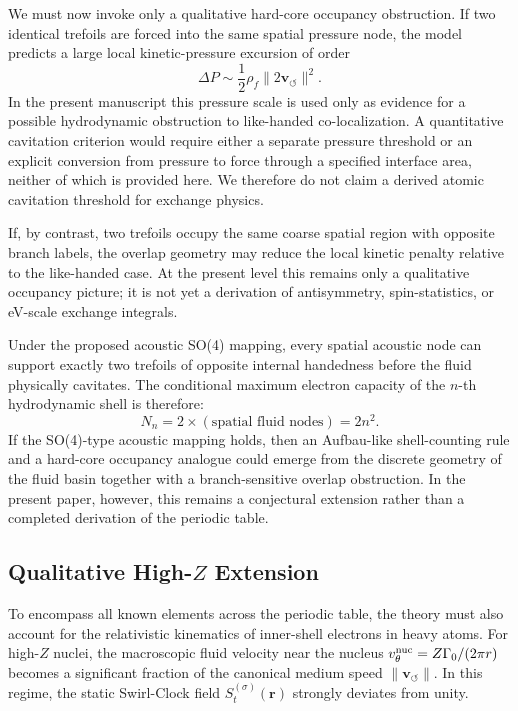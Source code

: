 \documentclass[11pt,a4paper]{article}
\begin{document}
        We must now invoke only a qualitative hard-core occupancy obstruction. If two identical trefoils are forced into the same spatial pressure node, the model predicts a large local kinetic-pressure excursion of order
        \begin{equation}
            \Delta P \sim \frac{1}{2}\rho_{\!f}\lVert 2\mathbf{v}_{\!\boldsymbol{\circlearrowleft}} \rVert^2.
        \end{equation}
        In the present manuscript this pressure scale is used only as evidence for a possible hydrodynamic obstruction to like-handed co-localization. A quantitative cavitation criterion would require either a separate pressure threshold or an explicit conversion from pressure to force through a specified interface area, neither of which is provided here. We therefore do not claim a derived atomic cavitation threshold for exchange physics.
        
        If, by contrast, two trefoils occupy the same coarse spatial region with opposite branch labels, the overlap geometry may reduce the local kinetic penalty relative to the like-handed case. At the present level this remains only a qualitative occupancy picture; it is not yet a derivation of antisymmetry, spin-statistics, or eV-scale exchange integrals.
        
        Under the proposed acoustic SO(4) mapping, every spatial acoustic node can support exactly two trefoils of opposite internal handedness before the fluid physically cavitates. The conditional maximum electron capacity of the $n$-th hydrodynamic shell is therefore:
        \begin{equation}
            \label{eq:AufbauDerived}
            \boxed{
                N_n = 2 \times (\text{spatial fluid nodes}) = 2n^2.
            }
        \end{equation}
        If the SO(4)-type acoustic mapping holds, then an Aufbau-like shell-counting rule and a hard-core occupancy analogue could emerge from the discrete geometry of the fluid basin together with a branch-sensitive overlap obstruction. In the present paper, however, this remains a conjectural extension rather than a completed derivation of the periodic table.
    
    \subsection{Qualitative High-$Z$ Extension}
        To encompass all known elements across the periodic table, the theory must also account for the relativistic kinematics of inner-shell electrons in heavy atoms. For high-$Z$ nuclei, the macroscopic fluid velocity near the nucleus $v_{\theta}^{\rm nuc} = Z \Gamma_0 / (2\pi r)$ becomes a significant fraction of the canonical medium speed $\lVert\mathbf{v}_{\!\boldsymbol{\circlearrowleft}}\rVert$. In this regime, the static Swirl-Clock field $S_t^{(\sigma)}(\mathbf r)$ strongly deviates from unity.
        
\end{document}
